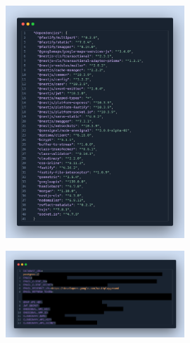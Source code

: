 \label{apendix:dependencias-api}
\begin{figure}[H]
    \centering
    \includegraphics[width=0.6\textwidth]{chapters/appendices/code/dependencias-api.png}
\end{figure}


\label{apendix:configuracion-env-api}
\begin{figure}[H]
    \centering
    \includegraphics[width=0.6\textwidth]{chapters/appendices/code/configuracion-env-api.png}
\end{figure}


